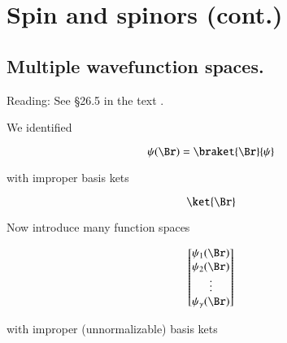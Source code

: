 %
%

\chapter{Spin and spinors (cont.)}
\label{chap:qmTwoL13}
{}
\date{Oct 24, 2011}

\beginArtWithToc

%

\section{Multiple wavefunction spaces.}

Reading: See \S 26.5 in the text \cite{desai2009quantum}.

We identified 

\begin{equation}\label{eqn:qmTwoL13:10}
\psi(\Br) = \braket{ \Br}{\psi}
\end{equation}

with improper basis kets

\begin{equation}\label{eqn:qmTwoL13:30}
\ket{\Br}
\end{equation}

Now introduce many function spaces

\begin{equation}\label{eqn:qmTwoL13:50}
\begin{bmatrix}
\psi_1(\Br) \\
\psi_2(\Br) \\
\vdots \\
\psi_\gamma(\Br)
\end{bmatrix}
\end{equation}

with improper (unnormalizable) basis kets

